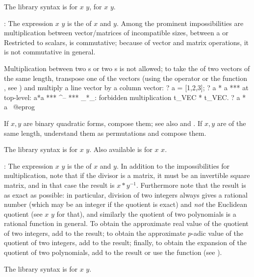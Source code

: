 The library syntax is  for $x$ \kbd{+} $y$,
 for $x$ \kbd{-} $y$.

\subseckbd{*}: The expression $x$ \kbd{*} $y$ is the  of $x$
and $y$. Among the prominent impossibilities are multiplication between
vector/matrices of incompatible sizes, between a  or 
Restricted to scalars, \kbd{*} is commutative; because of vector and matrix
operations, it is not commutative in general.

Multiplication between two s or two s is not
allowed; to take the  of two vectors of the same length,
transpose one of the vectors (using the operator \kbd{\til} or the function
, see ) and multiply a line vector
by a column vector:
\bprog
? a = [1,2,3];
? a * a
  ***   at top-level: a*a
  ***                  ^--
  *** _*_: forbidden multiplication t_VEC * t_VEC.
? a * a~
@eprog

If $x,y$ are binary quadratic forms, compose them; see also
 and . If $x,y$ are  of the same
length, understand them as permutations and compose them.

The library syntax is  for $x$ \kbd{*} $y$.
Also available is  for $x$ \kbd{*} $x$.

\subseckbd{/}: The expression $x$ \kbd{/} $y$ is the  of $x$
and $y$. In addition to the impossibilities for multiplication, note that if
the divisor is a matrix, it must be an invertible square matrix, and in that
case the result is $x*y^{-1}$. Furthermore note that the result is as exact
as possible: in particular, division of two integers always gives a rational
number (which may be an integer if the quotient is exact) and \emph{not} the
Euclidean quotient (see $x$ \kbd{\bs} $y$ for that), and similarly the
quotient of two polynomials is a rational function in general. To obtain the
approximate real value of the quotient of two integers, add  to the
result; to obtain the approximate $p$-adic value of the quotient of two
integers, add  to the result; finally, to obtain the
 expansion of the quotient of two polynomials, add
 to the result or use the  function
(see ). \label{se:gdiv}

The library syntax is  for $x$ \kbd{/} $y$.

